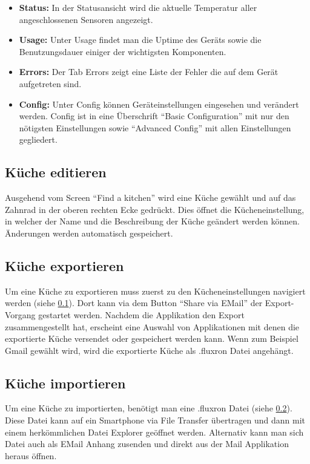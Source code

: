 \begin{itemize}
\item \textbf{Status:}
In der Statusansicht wird die aktuelle Temperatur aller angeschlossenen Sensoren angezeigt. \\
\item \textbf{Usage:}
Unter Usage findet man die Uptime des Geräts sowie die Benutzungsdauer einiger der wichtigsten Komponenten. \\

\item \textbf{Errors:}
Der Tab Errors zeigt eine Liste der Fehler die auf dem Gerät aufgetreten sind. \\

\item \textbf{Config:}
Unter Config können Geräteinstellungen eingesehen und verändert werden. Config ist in eine Überschrift \enquote{Basic Configuration} mit nur den nötigsten Einstellungen sowie \enquote{Advanced Config} mit allen Einstellungen gegliedert.
\end{itemize}

\WFclear
\subsection{Küche editieren}
\label{subsec:kuecheEditieren}
Ausgehend vom Screen \enquote{Find a kitchen} wird eine Küche gewählt und auf das Zahnrad in der oberen rechten Ecke gedrückt. Dies öffnet die Kücheneinstellung, in welcher der Name und die Beschreibung der Küche geändert werden können. Änderungen werden automatisch gespeichert.

\subsection{Küche exportieren}
\label{subsec:kuecheExportieren}
Um eine Küche zu exportieren muss zuerst zu den Kücheneinstellungen navigiert werden (siehe \ref{subsec:kuecheEditieren}). Dort kann via dem Button \enquote{Share via EMail} der Export-Vorgang gestartet werden. Nachdem die Applikation den Export zusammengestellt hat, erscheint eine Auswahl von Applikationen mit denen die exportierte Küche versendet oder gespeichert werden kann. Wenn zum Beispiel Gmail gewählt wird, wird die exportierte Küche als .fluxron Datei angehängt. 

\subsection{Küche importieren}
Um eine Küche zu importierten, benötigt man eine .fluxron Datei (siehe \ref{subsec:kuecheExportieren}). Diese Datei kann auf ein Smartphone via File Transfer übertragen und dann mit einem herkömmlichen Datei Explorer geöffnet werden. Alternativ kann man sich Datei auch als EMail Anhang zusenden und direkt aus der Mail Applikation heraus öffnen.

